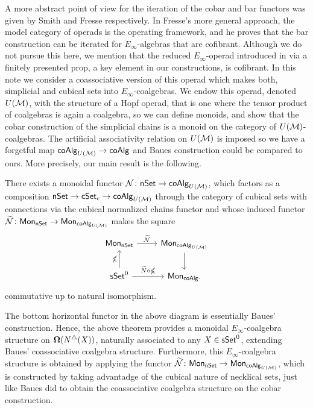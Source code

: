 A more abstract point of view for the iteration of the cobar and bar functors was given by Smith \cite{Smith94cobar} and Fresse \cite{Fresse10complex} respectively. 
In Fresse's more general approach, the model category of operads is the operating framework, and he proves that the bar construction can be iterated for $E_\infty$-algebras that are cofibrant. Although we do not pursue this here, we mention that the reduced $E_\infty$-operad introduced in \cite{Medina20prop1} via a finitely presented prop, a key element in our constructions, is cofibrant.
In this note we consider a coassociative version of this operad which makes both, simplicial and cubical sets into $E_\infty$-coalgebras.
We endow this operad, denoted $U(\mathcal{M})$, with the structure of a Hopf operad, that is one where the tensor product of coalgebras is again a coalgebra, so we can define monoids, and show that the cobar construction of the simplicial chains is a monoid on the category of $U(\mathcal{M})$-coalgebras.
The artificial associativity relation on $U(\mathcal{M})$ is imposed so we have a forgetful map $\mathsf{coAlg}_{U(\mathcal{M})} \to \mathsf{coAlg}$ and Baues construction could be compared to ours. More precisely, our main result is the following.

\begin{theorem}
There exists a monoidal functor $\mathcal{N} \colon \mathsf{nSet} \to \mathsf{coAlg}_{U(\mathcal{M})}$, which factors as a composition $\mathsf{nSet} \to \mathsf{cSet}_c \to \mathsf{coAlg}_{U(\mathcal{M})}$ through the category of cubical sets with connections via the cubical normalized chains functor and whose induced functor $\widetilde{\mathcal{N}} \colon \mathsf{Mon}_{\mathsf{nSet}} \to \mathsf{Mon}_{\mathsf{coAlg}_{U(\mathcal{M})}}$ makes the square
\begin{equation*}
\begin{tikzcd}
\Mon_{\nSet} \arrow[r, "\widetilde{\mathcal{N}}"] & \Mon_{\coAlg_{U(\M)}} \arrow[d]\\
\sSet^0 \arrow[r, "\widetilde{N} \circ \gcobar"] \arrow[u, "\gcobar"] & \Mon_{\coAlg}.
\end{tikzcd}
\end{equation*}
commutative up to natural isomorphism.
\end{theorem} 

The bottom horizontal functor in the above diagram is essentially Baues' construction. Hence, the above theorem provides a monoidal $E_{\infty}$-coalgebra structure on $\mathbf{\Omega}(N^{\triangle} (X))$, naturally associated to any $X \in \mathsf{sSet}^0$, extending Baues' coassociative coalgebra structure. Furthermore, this $E_{\infty}$-coalgebra structure is obtained by applying the functor $\widetilde{\mathcal{N}} \colon \mathsf{Mon}_{\mathsf{nSet}} \to \mathsf{Mon}_{\mathsf{coAlg}_{U(\mathcal{M})}}$, which is constructed by taking advantadge of the cubical nature of necklical sets, just like Baues did to obtain the coassociative coalgebra structure on the cobar construction. 

